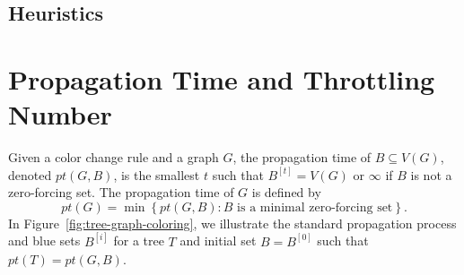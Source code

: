 \documentclass{article}
\theoremstyle{definition}
\begin{document}
\subsection{Heuristics}


\section{Propagation Time and Throttling Number}
Given a color change rule and a graph $G$, the propagation time of $B\subseteq V(G)$, denoted $pt(G,B)$, is the smallest $t$ such that $B^{[t]}=V(G)$ or $\infty$ if $B$ is not a zero-forcing set.
The propagation time of $G$ is defined by
\[
pt(G) = \min\left\{pt(G,B)\colon\text{$B$ is a minimal zero-forcing set}\right\}.
\]
In Figure~\ref{fig:tree-graph-coloring}, we illustrate the standard propagation process and blue sets $B^{[i]}$ for a tree $T$ and initial set $B=B^{[0]}$ such that $pt(T) = pt(G,B)$.
\end{document}
